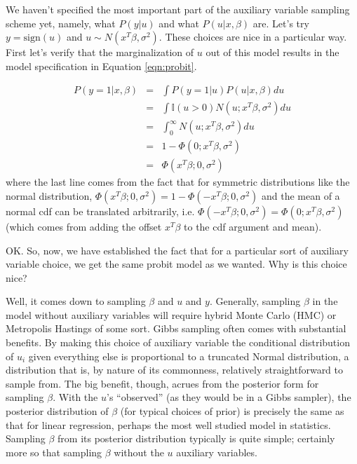 We haven't specified the most important part of the auxiliary variable sampling scheme yet, namely, what $P(y|u)$ and what $P(u|x,\beta)$ are.   Let's try $y = \mbox{sign}(u)$ and $u \sim N(x^T\beta,\sigma^2).$  These choices are nice in a particular way.  First let's verify that the marginalization of $u$ out of this model results in the model specification in Equation \ref{eqn:probit}.

\begin{eqnarray*}
P(y=1|x,\beta) &=&  \int P(y=1|u)P(u|x,\beta)du\\
&=& \int \mathbb{I}(u>0)N(u;x^T\beta,\sigma^2) du \\
&=& \int_0^\infty N(u;x^T\beta,\sigma^2) du \\
&=& 1 - \Phi(0; x^T\beta,\sigma^2) \\ 
&=& \Phi(x^T\beta; 0, \sigma^2)
\end{eqnarray*}
where the last line comes from the fact that for symmetric distributions like the normal distribution, 
$\Phi(x^T\beta; 0, \sigma^2) = 1 - \Phi(-x^T\beta; 0, \sigma^2)$ and the mean of a normal cdf can be translated arbitrarily, i.e. $\Phi(-x^T\beta; 0, \sigma^2) = \Phi(0;x^T\beta, \sigma^2)$ (which comes from adding the offset $x^T\beta$ to the cdf argument and mean).  

OK.  So, now, we have established the fact that for a particular sort of auxiliary variable choice, we get the same probit model as we wanted.  Why is this choice nice?

Well, it comes down to sampling $\beta$ and $u$ and $y$.  Generally, sampling $\beta$ in the model without auxiliary variables will require hybrid Monte Carlo (HMC) or Metropolis Hastings of some sort.  Gibbs sampling often comes with substantial benefits.  By making this choice of auxiliary variable the conditional distribution of $u_i$ given everything else is proportional to a truncated Normal distribution, a distribution that is, by nature of its commonness, relatively straightforward to sample from.  The big benefit, though, acrues from the posterior form for sampling $\beta$.  With the $u$'s ``observed'' (as they would be in a Gibbs sampler), the posterior distribution of $\beta$ (for typical choices of prior) is precisely the same as that for linear regression, perhaps the most well studied model in statistics.  Sampling $\beta$ from its posterior distribution typically is quite simple; certainly more so that sampling $\beta$ without the $u$ auxiliary variables.

